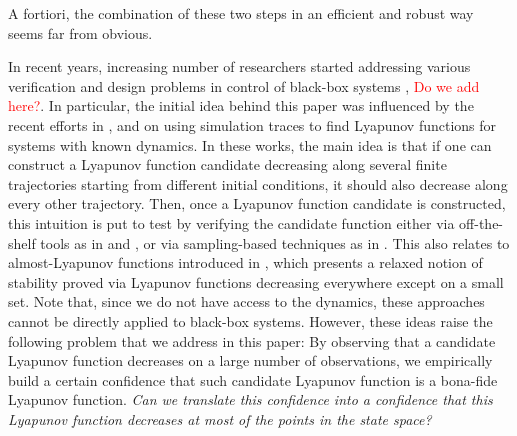 A fortiori, the combination of these two steps in an efficient and robust way seems far from obvious.

In recent years, increasing number of researchers started addressing various verification and design problems in control of black-box systems \cite{bianchini, balkan, mitra, mitra2}, \textcolor{red}{Do we add \cite{kozarev2016case} here?}. In particular, the initial idea behind this paper was influenced by the recent efforts in \cite{topcu, kapinski}, and \cite{lazar} on using simulation traces to find Lyapunov functions for systems with known dynamics. In these works, the main idea is that if one can construct a Lyapunov function candidate decreasing along several finite trajectories starting from different initial conditions, it should also decrease along every other trajectory. Then, once a Lyapunov function candidate is constructed, this intuition is put to test by verifying the candidate function either via off-the-shelf tools as in \cite{topcu} and \cite{kapinski}, or via sampling-based techniques as in \cite{lazar}. This also relates to almost-Lyapunov functions introduced in \cite{liberzon}, which presents a relaxed notion of stability proved via Lyapunov functions decreasing everywhere except on a small set. Note that, since we do not have access to the dynamics, these approaches cannot be directly applied to black-box systems. However, these ideas raise the following problem that we address in this paper: By observing that a candidate Lyapunov function decreases on a large number of observations, we empirically build a certain confidence that such candidate Lyapunov function is a bona-fide Lyapunov function. \emph{Can we translate this confidence into a confidence that this Lyapunov function decreases at most of the points in the state space?} 

